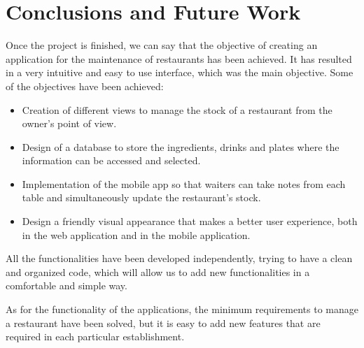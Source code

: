 \chapter*{Conclusions and Future Work}
\label{cap:conclusions}

Once the project is finished, we can say that the objective of creating an application for the maintenance of restaurants has been achieved. It has resulted in a very intuitive and easy to use interface, which was the main objective. Some of the objectives have been achieved:

\begin{itemize} 

\item Creation of different views to manage the stock of a restaurant from the owner's point of view.
 
\item Design of a database to store the ingredients, drinks and plates where the information can be accessed and selected.

\item Implementation of the mobile app so that waiters can take notes from each table and simultaneously update the restaurant's stock.

\item Design a friendly visual appearance that makes a better user experience, both in the web application and in the mobile application.

 \end{itemize}

All the functionalities have been developed independently, trying to have a clean and organized code, which will allow us to add new functionalities in a comfortable and simple way.

As for the functionality of the applications, the minimum requirements to manage a restaurant have been solved, but it is easy to add new features that are required in each particular establishment.

